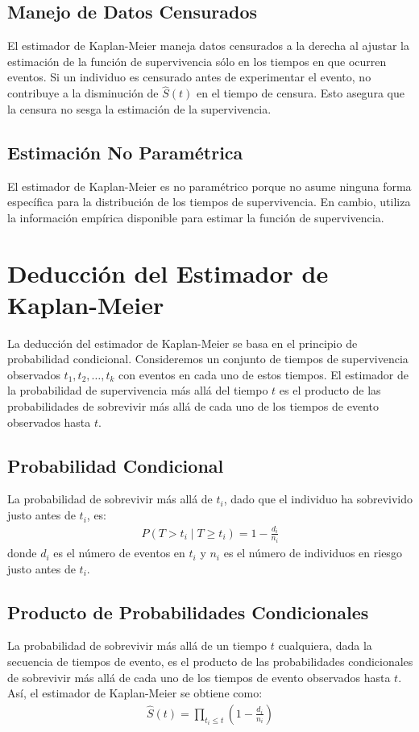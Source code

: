 \documentclass[a4paper]{report} %
\begin{document}
\subsection{Manejo de Datos Censurados}
El estimador de Kaplan-Meier maneja datos censurados a la derecha al ajustar la estimaci\'on de la funci\'on de supervivencia s\'olo en los tiempos en que ocurren eventos. Si un individuo es censurado antes de experimentar el evento, no contribuye a la disminuci\'on de $\hat{S}(t)$ en el tiempo de censura. Esto asegura que la censura no sesga la estimaci\'on de la supervivencia.

\subsection{Estimaci\'on No Param\'etrica}
El estimador de Kaplan-Meier es no param\'etrico porque no asume ninguna forma espec\'ifica para la distribuci\'on de los tiempos de supervivencia. En cambio, utiliza la informaci\'on emp\'irica disponible para estimar la funci\'on de supervivencia.

\section{Deducci\'on del Estimador de Kaplan-Meier}
La deducci\'on del estimador de Kaplan-Meier se basa en el principio de probabilidad condicional. Consideremos un conjunto de tiempos de supervivencia observados $t_1, t_2, \ldots, t_k$ con eventos en cada uno de estos tiempos. El estimador de la probabilidad de supervivencia m\'as all\'a del tiempo $t$ es el producto de las probabilidades de sobrevivir m\'as all\'a de cada uno de los tiempos de evento observados hasta $t$.

\subsection{Probabilidad Condicional}
La probabilidad de sobrevivir m\'as all\'a de $t_i$, dado que el individuo ha sobrevivido justo antes de $t_i$, es:
\begin{eqnarray*}
P(T > t_i \mid T \geq t_i) = 1 - \frac{d_i}{n_i}
\end{eqnarray*}
donde $d_i$ es el n\'umero de eventos en $t_i$ y $n_i$ es el n\'umero de individuos en riesgo justo antes de $t_i$.

\subsection{Producto de Probabilidades Condicionales}
La probabilidad de sobrevivir m\'as all\'a de un tiempo $t$ cualquiera, dada la secuencia de tiempos de evento, es el producto de las probabilidades condicionales de sobrevivir m\'as all\'a de cada uno de los tiempos de evento observados hasta $t$. As\'i, el estimador de Kaplan-Meier se obtiene como:
\begin{eqnarray*}
\hat{S}(t) = \prod_{t_i \leq t} \left(1 - \frac{d_i}{n_i}\right)
\end{eqnarray*}
\end{document}
